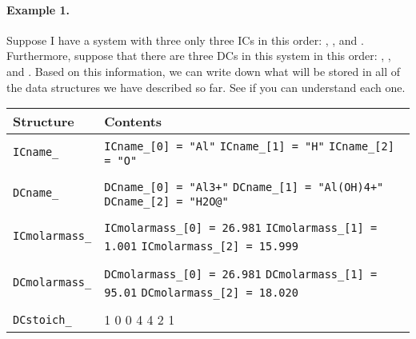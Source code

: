\documentclass{article}
\begin{document}
\paragraph{Example 1.}  Suppose I have a system with three only three ICs in this order:
, , and .  Furthermore, suppose that there are three DCs in this
system in this order: , , and .  Based on this
information, we can write down what will be stored in all of the data structures
we have described so far.  See if you can understand each one.

\scriptsize{
\begin{tabular}{l p{4.0in}} \toprule
\textbf{Structure} & \textbf{Contents} \\ \midrule
\verb!ICname_! & \verb!ICname_[0] = "Al"! \hspace{0.1in} 
                 \verb!ICname_[1] = "H"!  \hspace{0.1in}
                 \verb!ICname_[2] = "O"! \\
                 & \\
\verb!DCname_! & \verb!DCname_[0] = "Al3+"! \hspace{0.1in}
                 \verb!DCname_[1] = "Al(OH)4+"! \hspace{0.1in}
                 \verb!DCname_[2] = "H2O@"! \\
                 & \\
\verb!ICmolarmass_! & \verb!ICmolarmass_[0] = 26.981! \hspace{0.1in}
                 \verb!ICmolarmass_[1] = 1.001! \hspace{0.1in}
                      \verb!ICmolarmass_[2] = 15.999! \\
                 & \\
\verb!DCmolarmass_! & \verb!DCmolarmass_[0] = 26.981! \hspace{0.1in}
                 \verb!DCmolarmass_[1] = 95.01! \hspace{0.1in}
                      \verb!DCmolarmass_[2] = 18.020! \\
                 & \\
\verb!DCstoich_! &     1 \hspace{0.25in} 0 \hspace{0.25in} 0 \newline
                       1 \hspace{0.25in} 4 \hspace{0.25in} 4 \newline
                       0 \hspace{0.25in} 2 \hspace{0.25in} 1 \\ \bottomrule
\end{tabular}
}
\end{document}
